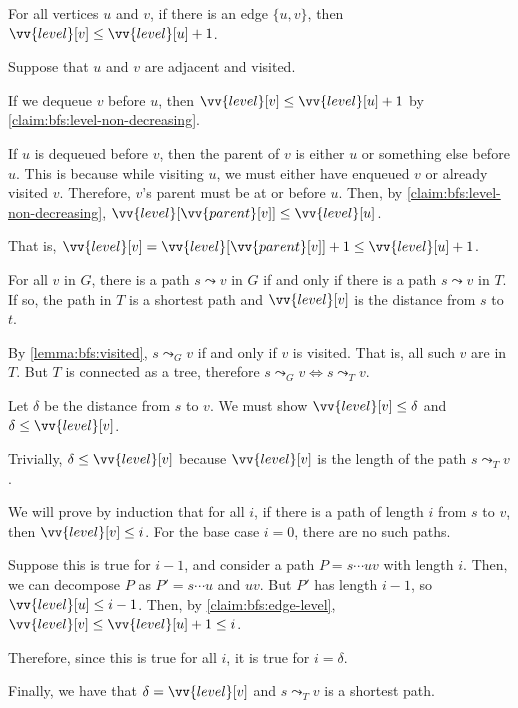 \begin{claim}\label{claim:bfs:edge-level}
  For all vertices $u$ and $v$, if there is an edge $\{u,v\}$,
  then $\vv{level}[v] \leq \vv{level}[u] + 1$.
\end{claim}
\begin{prf}
  Suppose that $u$ and $v$ are adjacent and visited.

  If we dequeue $v$ before $u$, then $\vv{level}[v] \leq \vv{level}[u] + 1$
  by \cref{claim:bfs:level-non-decreasing}.

  If $u$ is dequeued before $v$, then the parent of $v$ is
  either $u$ or something else before $u$.
  This is because while visiting $u$, we must either have enqueued $v$
  or already visited $v$.
  Therefore, $v$'s parent must be at or before $u$.
  Then, by \cref{claim:bfs:level-non-decreasing},
  $\vv{level}[\vv{parent}[v]] \leq \vv{level}[u]$.

  That is, $\vv{level}[v] = \vv{level}[\vv{parent}[v]] + 1 \leq \vv{level}[u] + 1$.
\end{prf}

\begin{lemma}
  For all $v$ in $G$,
  there is a path $s \leadsto v$ in $G$ if and only if
  there is a path $s \leadsto v$ in $T$.
  If so, the path in $T$ is a shortest path and $\vv{level}[v]$ is the distance from $s$ to $t$.
\end{lemma}
\begin{prf}
  By \cref{lemma:bfs:visited}, $s \leadsto_G v$ if and only if $v$ is visited.
  That is, all such $v$ are in $T$.
  But $T$ is connected as a tree, therefore $s \leadsto_G v \iff s \leadsto_T v$.

  Let $\delta$ be the distance from $s$ to $v$.
  We must show $\vv{level}[v] \leq \delta$ and $\delta \leq \vv{level}[v]$.

  Trivially, $\delta \leq \vv{level}[v]$ because $\vv{level}[v]$
  is the length of the path $s \leadsto_T v$.

  We will prove by induction that for all $i$,
  if there is a path of length $i$ from $s$ to $v$,
  then $\vv{level}[v] \leq i$.
  For the base case $i=0$, there are no such paths.

  Suppose this is true for $i-1$, and consider a path $P = s\dotsb uv$ with length $i$.
  Then, we can decompose $P$ as $P' = s\dotsb u$ and $uv$.
  But $P'$ has length $i-1$, so $\vv{level}[u] \leq i-1$.
  Then, by \cref{claim:bfs:edge-level}, $\vv{level}[v] \leq \vv{level}[u] + 1 \leq i$.

  Therefore, since this is true for all $i$, it is true for $i=\delta$.

  Finally, we have that $\delta = \vv{level}[v]$ and $s \leadsto_T v$ is a shortest path.
\end{prf}

